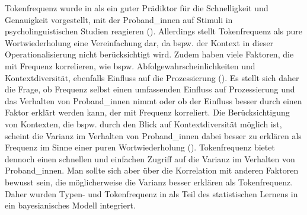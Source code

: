 Tokenfrequenz wurde in  als ein guter Prädiktor für die Schnelligkeit und Genauigkeit vorgestellt, mit der Proband\_innen auf Stimuli in psycholinguistischen Studien reagieren (\cite[55]{Divjak.2015}). Allerdings stellt Tokenfrequenz als pure Wortwiederholung eine Vereinfachung dar, da bspw. der Kontext in dieser Operationalisierung nicht berücksichtigt wird. Zudem haben viele Faktoren, die mit Frequenz korrelieren, wie bspw. Abfolgewahrscheinlichkeiten und Kontextdiversität, ebenfalls Einfluss auf die Prozessierung (\cite{McDonald.2003, Baayen.2012}). Es stellt sich daher die Frage, ob Frequenz selbst einen umfassenden Einfluss auf Prozessierung und das Verhalten von Proband\_innen nimmt oder ob der Einfluss besser durch einen Faktor erklärt werden kann, der mit Frequenz korreliert. Die Berücksichtigung von Kontexten, die bspw. durch den Blick auf Kontextdiversität möglich ist, scheint die Varianz im Verhalten von Proband\_innen dabei besser zu erklären als Frequenz im Sinne einer puren Wortwiederholung (\cite[181--191]{Baayen.2012}). Tokenfrequenz bietet dennoch einen schnellen und einfachen Zugriff auf die Varianz im Verhalten von Proband\_innen. Man sollte sich aber über die Korrelation mit anderen Faktoren bewusst sein, die möglicherweise die Varianz besser erklären als Tokenfrequenz. Daher wurden Typen- und Tokenfrequenz in   als Teil des statistischen Lernens in ein bayesianisches Modell integriert.

